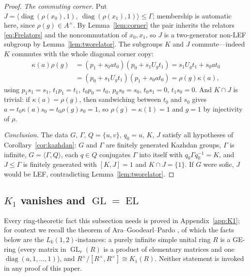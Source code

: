 \documentclass[11pt]{amsart}
\theoremstyle{definition}
\theoremstyle{plain}
\newcommand{\GL}{\operatorname{GL}}
\newcommand{\EL}{\operatorname{EL}}
\DeclareMathOperator{\diag}{diag}
\begin{document}
\begin{proof}
\emph{The commuting corner.}  Put \(J=\bigl\langle\diag(\rho(x_0),1),\ \diag(\rho(x_1),1)\bigr\rangle\leq\Gamma\); membership is automatic here, since \(\rho(g)\in A^\times\).  By Lemma~\ref{lem:corner} the pair inherits the relators \eqref{eq:Frelators} and the noncommutation of \(x_0,x_1\), so \(J\) is a two-generator non-LEF subgroup by Lemma~\ref{lem:tworelator}.  The subgroups \(K\) and \(J\) commute---indeed \(K\) commutes with the whole diagonal corner copy:
\begin{align*}
 \kappa(a)\rho(g)
 &=(p_1+s_0at_0)(p_0+s_1U_gt_1)
 =s_1U_gt_1+s_0at_0\\
 &=(p_0+s_1U_gt_1)(p_1+s_0at_0)
 =\rho(g)\kappa(a),
\end{align*}
using \(p_1s_1=s_1\), \(t_1p_1=t_1\), \(t_0p_0=t_0\), \(p_0s_0=s_0\), \(t_0s_1=0\), \(t_1s_0=0\).  And \(K\cap J\) is trivial: if \(\kappa(a)=\rho(g)\), then sandwiching between \(t_0\) and \(s_0\) gives \(a=t_0\kappa(a)s_0=t_0\rho(g)s_0=1\), so \(\rho(g)=\kappa(1)=1\) and \(g=1\) by injectivity of \(\rho\).

\emph{Conclusion.}  The data \(G\), \(\Gamma\), \(Q=\{u,v\}\), \(q_0=u\), \(K\), \(J\) satisfy all hypotheses of Corollary~\ref{cor:kazhdan}: \(G\) and \(\Gamma\) are finitely generated Kazhdan groups, \(\Gamma\) is infinite, \(G=\langle\Gamma,Q\rangle\), each \(q\in Q\) conjugates \(\Gamma\) into itself with \(q_0\Gamma q_0^{-1}=K\), and \(J\leq\Gamma\) is finitely generated with \([K,J]=1\) and \(K\cap J=\{1\}\).  If \(G\) were sofic, \(J\) would be LEF, contradicting Lemma~\ref{lem:tworelator}.
\end{proof}

\subsection{\texorpdfstring{$K_1$}{K1} vanishes and \texorpdfstring{$\GL=\EL$}{GL=EL}}\label{subsec:glel}

Every ring-theoretic fact this subsection needs is proved in Appendix~\ref{app:K1}; for context we recall the theorem of Ara--Goodearl--Pardo \cite{AraGoodearlPardo02}, of which the facts below are the \(L_k(1,2)\)-instances: a purely infinite simple unital ring \(R\) is a GE-ring (every matrix in \(\GL_r(R)\) is a product of elementary matrices and one \(\diag(a,1,\dots,1)\)), and \(R^\times/[R^\times,R^\times]\cong K_1(R)\).  Neither statement is invoked in any proof of this paper.
\end{document}
